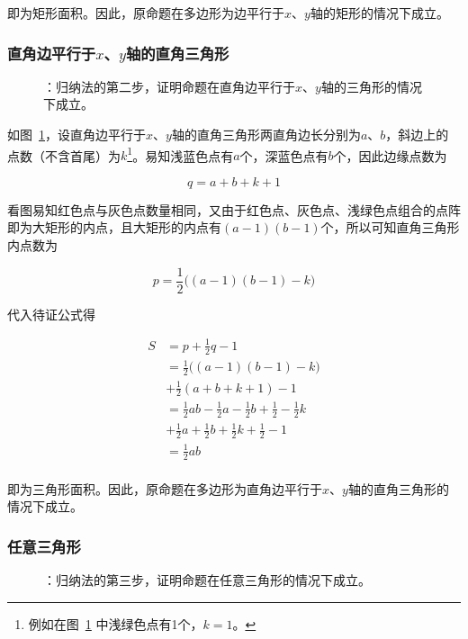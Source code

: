 即为矩形面积。因此，原命题在多边形为边平行于$x$、$y$轴的矩形的情况下成立。

\subsubsection{直角边平行于$x$、$y$轴的直角三角形} \label{subsubsec:0012-ind-rttri}

\begin{figure}[htbp]
  \centering
  \caption{：归纳法的第二步，证明命题在直角边平行于$x$、$y$轴的三角形的情况下成立。}
  \label{fig:0012-ind-rttri}
\end{figure}

如图~\ref{fig:0012-ind-rttri}，设直角边平行于$x$、$y$轴的直角三角形两直角边长分别为$a$、$b$，斜边上的点数（不含首尾）为$k$\footnote{例如在图~\ref{fig:0012-ind-rttri} 中浅绿色点有1个，$k = 1$。}。易知浅蓝色点有$a$个，深蓝色点有$b$个，因此边缘点数为

\[ q = a + b + k + 1 \]

看图易知红色点与灰色点数量相同，又由于红色点、灰色点、浅绿色点组合的点阵即为大矩形的内点，且大矩形的内点有$(a - 1)(b - 1)$个，所以可知直角三角形内点数为

\[ p = \frac12\Big((a - 1)(b - 1) - k\Big) \]

代入待证公式得

\begin{align*}
  S &= p + \frac12q - 1 \\
  &= \frac12\Big((a - 1)(b - 1) - k\Big) \\
  &+ \frac12(a + b + k + 1) - 1 \\
  &= \frac12ab - \frac12a - \frac12b + \frac12 - \frac12k \\
  &+ \frac12a + \frac12b + \frac12k + \frac12 - 1 \\
  &= \frac12ab \\
\end{align*}

即为三角形面积。因此，原命题在多边形为直角边平行于$x$、$y$轴的直角三角形的情况下成立。

\subsubsection{任意三角形} \label{subsubsec:0012-ind-tri}

\begin{figure}[htbp]
  \centering
  \caption{：归纳法的第三步，证明命题在任意三角形的情况下成立。}
  \label{fig:0012-ind-tri}
\end{figure}

